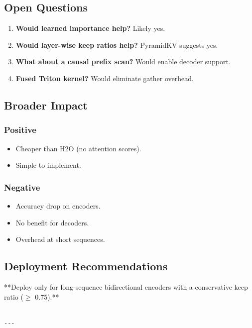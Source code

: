 \subsection{Open Questions}

\begin{enumerate}
\item \textbf{Would learned importance help?} Likely yes.
\item \textbf{Would layer-wise keep ratios help?} PyramidKV suggests yes.
\item \textbf{What about a causal prefix scan?} Would enable decoder support.
\item \textbf{Fused Triton kernel?} Would eliminate gather overhead.

\end{enumerate}
\subsection{Broader Impact}

\subsubsection{Positive}

\begin{itemize}
\item Cheaper than H2O (no attention scores).
\item Simple to implement.

\end{itemize}
\subsubsection{Negative}

\begin{itemize}
\item Accuracy drop on encoders.
\item No benefit for decoders.
\item Overhead at short sequences.

\end{itemize}
\subsection{Deployment Recommendations}

**Deploy only for long-sequence bidirectional encoders with a conservative 
keep ratio ($\ge$ 0.75).**
\begin{lstlisting}

---
\end{lstlisting}


